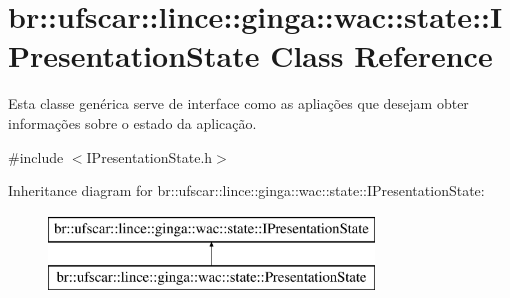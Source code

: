 \hypertarget{classbr_1_1ufscar_1_1lince_1_1ginga_1_1wac_1_1state_1_1IPresentationState}{
\section{br::ufscar::lince::ginga::wac::state::IPresentationState Class Reference}
\label{classbr_1_1ufscar_1_1lince_1_1ginga_1_1wac_1_1state_1_1IPresentationState}
}


Esta classe genérica serve de interface como as apliações que desejam obter informações sobre o estado da aplicação.  




{\ttfamily \#include $<$IPresentationState.h$>$}

Inheritance diagram for br::ufscar::lince::ginga::wac::state::IPresentationState:\begin{figure}[H]
\begin{center}
\leavevmode
\includegraphics[height=2cm]{classbr_1_1ufscar_1_1lince_1_1ginga_1_1wac_1_1state_1_1IPresentationState}
\end{center}
\end{figure}
